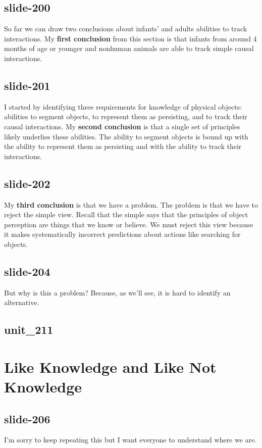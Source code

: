 \documentclass[12pt,\papersize]{extarticle}
\begin{document}
\subsection{slide-200}
So far we can draw two conclusions about infants' and adults abilities to track 
interactions.  My \textbf{first conclusion} from this section is that infants from around 
4 months of 
age or younger and nonhuman animals are able to track simple causal interactions.
 
\subsection{slide-201}
I started by identifying three requirements for knowledge of physical objects: 
abilities to segment objects, to represent them as persisting, and to track their causal 
interactions.
My \textbf{second conclusion} is that a single set of principles likely underlies these 
abilities.  The ability to segment objects is bound up with the ability 
to represent them as persisting and with the ability to track their interactions.
 
\subsection{slide-202}
My \textbf{third conclusion} is that we have a problem.
The problem is that we have to reject the simple view.
Recall that the simple says that the principles of object perception are things that we know 
or believe.
We must reject this view because it makes systematically incorrect predictions about actions 
like searching for objects.
 
\subsection{slide-204}
But why is this a problem? Because, as we'll see, it is hard to identify an alternative.
 
\subsection{unit\_211}
 
 
\section{Like Knowledge and Like Not Knowledge}
 
\subsection{slide-206}
I'm sorry to keep repeating this but I want everyone to understand where we are.
 
\end{document}
